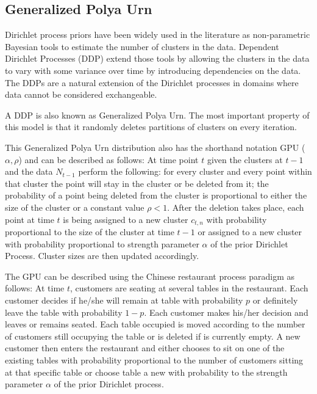 \documentclass [twoside,hidelinks]{article}
\begin{document}
\subsection{Generalized Polya Urn}


Dirichlet process priors have been widely used in the literature as non-parametric Bayesian tools to estimate the number of clusters in the data\cite{antoniak}. Dependent Dirichlet Processes (DDP) extend those tools by allowing the clusters in the data to vary with some variance over time by introducing dependencies on the data. The DDPs are a natural extension of the Dirichlet processes in domains where data cannot be considered exchangeable. 

A DDP is also known as Generalized Polya Urn\cite{caron}. The most important property of this model is that it randomly deletes partitions of clusters on every iteration. 


This Generalized Polya Urn distribution also has the shorthand notation GPU ($\alpha,\rho$) and can be described as follows: At time point $t$ given the clusters at $t-1$ and the data $N_{t-1}$ perform the following: for every cluster and every point within that cluster the point will stay in the cluster or be deleted from it; the probability of a point being deleted from the cluster is proportional to either the size of the cluster or a constant value $\rho <1$\cite{caron}. After the deletion takes place, each point at time $t$ is being assigned to a new cluster $c_{t,n}$  with probability proportional to the size of the cluster at time $t-1$ or assigned to a new cluster with probability proportional to strength parameter $\alpha$ of the prior Dirichlet Process. Cluster sizes are then updated accordingly.


The GPU can be described using the Chinese restaurant process paradigm as follows: At time $t$, customers are seating at several tables in the restaurant. Each customer decides if he/she will remain at table with probability $p$ or definitely leave the table with probability $1-p$. Each customer makes his/her decision and leaves or remains seated. Each table occupied is moved according to the number of customers still occupying the table or is deleted if is currently empty. A new customer then enters the restaurant and either chooses to sit on one of the existing tables with probability proportional to the number of customers sitting at that specific table or choose table a new with probability to the strength parameter $\alpha$ of the prior Dirichlet process.
\end{document}
